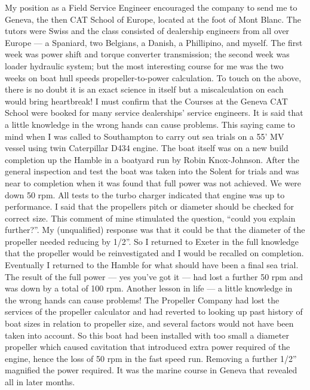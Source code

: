 My position as a Field Service Engineer encouraged the company to send me to
Geneva, the then CAT School of Europe, located at the foot of Mont Blanc. The
tutors were Swiss and the class consisted of dealership engineers from all over
Europe --- a Spaniard, two Belgians, a Danish, a Phillipino, and myself.
The first week was power shift and torque converter transmission; the second
week was loader hydraulic system; but the most interesting course for me was
the two weeks on boat hull speeds propeller-to-power calculation. To touch on
the above, there is no doubt it is an exact science in itself but a
miscalculation on each would bring heartbreak! I must confirm that the Courses
at the Geneva CAT School were booked for many service dealerships' service
engineers. It is said that a little knowledge in the wrong hands can cause
problems. This saying came to mind when I was called to Southampton to carry
out sea trials on a 55' MV vessel using twin Caterpillar D434 engine. The boat
itself was on a new build completion up the Hamble in a boatyard run by Robin
Knox-Johnson. After the general inspection and test the boat was taken into the
Solent for trials and was near to completion when it was found that full power
was not achieved. We were down 50 rpm. All tests to the turbo charger indicated
that engine was up to performance. I said that the propellers pitch or diameter
should be checked for correct size. This comment of mine stimulated the
question, ``could you explain further?''. My (unqualified) response was that it
could be that the diameter of the propeller needed reducing by 1/2''. So I
returned to Exeter in the full knowledge that the propeller would be
reinvestigated and I would be recalled on completion. Eventually I returned to
the Hamble for what should have been a final sea trial. The result of the full
power --- yes you've got it --- had lost a further 50 rpm and was down by a
total of 100 rpm. Another lesson in life --- a little knowledge in the wrong
hands can cause problems! The Propeller Company had lost the services of the
propeller calculator and had reverted to looking up past history of boat sizes
in relation to propeller size, and several factors would not have been taken
into account. So this boat had been installed with too small a diameter
propeller which caused cavitation that introduced extra power required of the
engine, hence the loss of 50 rpm in the fast speed run. Removing a further
1/2'' magnified the power required. It was the marine course in Geneva that
revealed all in later months.

